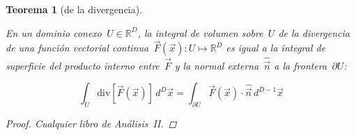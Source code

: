 \documentclass[
  12pt,
  a4paper,
  table]{scrbook}
\theoremstyle{plain}
\theoremstyle{definition}
\theoremstyle{plain}
\newtheorem{theorem}{Teorema}[chapter]
\theoremstyle{plain}
\theoremstyle{remark}
\begin{document}
\begin{theorem}[de la
divergencia]\protect\hypertarget{thm-divergencia}{}\label{thm-divergencia}

En un dominio conexo~\(U \in \mathbb{R}^D\), la integral de volumen
sobre~\(U\) de la divergencia de una función vectorial
continua~\(\vec{F}(\vec{x}) : U \mapsto \mathbb{R}^D\) es igual a la
integral de superficie del producto interno entre~\(\vec{F}\) y la
normal externa~\(\hat{\vec{n}}\) a la frontera~\(\partial U\):

\[
\int_U \mathrm{div} \left[ \vec{F}(\vec{x}) \right] \, d^D\vec{x} =
\int_{\partial U} \vec{F}(\vec{x}) \cdot \hat{\vec{n}} \, d^{D-1}\vec{x}
\]

\begin{proof}

Cualquier libro de Análisis~II.

\end{proof}

\end{theorem}
\end{document}
